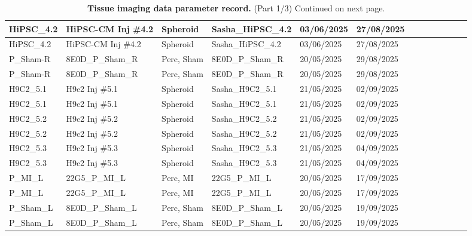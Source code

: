 \begin{table}[H]
\begin{tabular}{|>{\small}l||>{\tiny}l|>{\tiny}l|>{\tiny}l|>{\tiny}l|>{\tiny}l|>{\tiny}l|>{\tiny}l|>{\tiny}l|>{\tiny}l|>{\tiny}l|>{\tiny}l|>{\tiny}l|}
        HiPSC\_4.2 & HiPSC-CM Inj \#4.2 & Spheroid & Sasha\_HiPSC\_4.2 & 03/06/2025 & 27/08/2025    \\ \hline
        HiPSC\_4.2 & HiPSC-CM Inj \#4.2 & Spheroid & Sasha\_HiPSC\_4.2 & 03/06/2025 & 27/08/2025    \\ \hline
        P\_Sham-R & 8E0D\_P\_Sham\_R & Perc, Sham & 8E0D\_P\_Sham\_R & 20/05/2025 & 29/08/2025    \\ \hline
        P\_Sham-R & 8E0D\_P\_Sham\_R & Perc, Sham & 8E0D\_P\_Sham\_R & 20/05/2025 & 29/08/2025    \\ \hline
        H9C2\_5.1 & H9c2 Inj \#5.1 & Spheroid  & Sasha\_H9C2\_5.1 & 21/05/2025 & 02/09/2025   \\ \hline
        H9C2\_5.1 & H9c2 Inj \#5.1 & Spheroid  & Sasha\_H9C2\_5.1 & 21/05/2025 & 02/09/2025    \\ \hline
        H9C2\_5.2 & H9c2 Inj \#5.2 & Spheroid & Sasha\_H9C2\_5.2 & 21/05/2025 & 02/09/2025    \\ \hline
        H9C2\_5.2 & H9c2 Inj \#5.2 & Spheroid & Sasha\_H9C2\_5.2 & 21/05/2025 & 02/09/2025    \\ \hline
        H9C2\_5.3 & H9c2 Inj \#5.3 & Spheroid  & Sasha\_H9C2\_5.3 & 21/05/2025 & 04/09/2025    \\ \hline
        H9C2\_5.3 & H9c2 Inj \#5.3 & Spheroid  & Sasha\_H9C2\_5.3 & 21/05/2025 & 04/09/2025   \\ \hline
        P\_MI\_L & 22G5\_P\_MI\_L & Perc, MI & 22G5\_P\_MI\_L & 20/05/2025 & 17/09/2025 \\ \hline
        P\_MI\_L & 22G5\_P\_MI\_L & Perc, MI & 22G5\_P\_MI\_L & 20/05/2025 & 17/09/2025  \\ \hline
        P\_Sham\_L & 8E0D\_P\_Sham\_L & Perc, Sham & 8E0D\_P\_Sham\_L & 20/05/2025 & 19/09/2025  \\ \hline
        P\_Sham\_L & 8E0D\_P\_Sham\_L & Perc, Sham & 8E0D\_P\_Sham\_L & 20/05/2025 & 19/09/2025   \\ \hline
       
    \end{tabular}

\medskip
\caption{\textbf{Tissue imaging data parameter record.} (Part 1/3) Continued on next page.}
\end{table}




